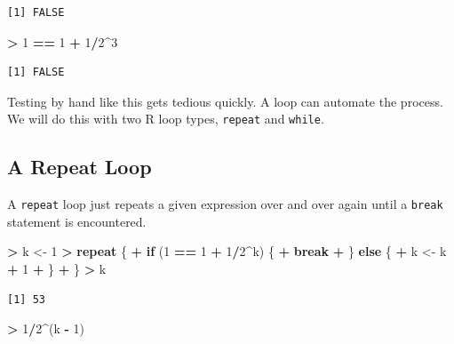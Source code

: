 \documentclass[]{krantz}
\makeatletter
\newenvironment{Shaded}{\begin{snugshade}}{\end{snugshade}}
\newcommand{\ControlFlowTok}[1]{\textcolor[rgb]{0.27,0.27,0.27}{\textbf{#1}}}
\newcommand{\DecValTok}[1]{\textcolor[rgb]{0.06,0.06,0.06}{#1}}
\newcommand{\NormalTok}[1]{#1}
\newcommand{\OperatorTok}[1]{\textcolor[rgb]{0.43,0.43,0.43}{\textbf{#1}}}
\newcommand{\StringTok}[1]{\textcolor[rgb]{0.5,0.5,0.5}{#1}}
\newenvironment{kframe}{%
\medskip{}
\setlength{\fboxsep}{.8em}
 \def\at@end@of@kframe{}%
 \ifinner\ifhmode%
  \def\at@end@of@kframe{\end{minipage}}%
  \begin{minipage}{\columnwidth}%
 \fi\fi%
 \def\FrameCommand##1{\hskip\@totalleftmargin \hskip-\fboxsep
 \colorbox{shadecolor}{##1}\hskip-\fboxsep
     \hskip-\linewidth \hskip-\@totalleftmargin \hskip\columnwidth}%
 \MakeFramed {\advance\hsize-\width
   \@totalleftmargin\z@ \linewidth\hsize
   \@setminipage}}%
 {\par\unskip\endMakeFramed%
 \at@end@of@kframe}
\renewenvironment{Shaded}{\begin{kframe}}{\end{kframe}}
\makeatother
\begin{document}
\begin{verbatim}
[1] FALSE
\end{verbatim}

\begin{Shaded}
\begin{Highlighting}[]
\OperatorTok{>}\StringTok{ }\DecValTok{1} \OperatorTok{==}\StringTok{ }\DecValTok{1} \OperatorTok{+}\StringTok{ }\DecValTok{1}\OperatorTok{/}\DecValTok{2}\OperatorTok{^}\DecValTok{3}
\end{Highlighting}
\end{Shaded}

\begin{verbatim}
[1] FALSE
\end{verbatim}

Testing by hand like this gets tedious quickly. A loop can automate the process. We will do this with two R loop types, \texttt{repeat} and \texttt{while}.

\hypertarget{a-repeat-loop}{%
\subsection{A Repeat Loop}\label{a-repeat-loop}}

A \texttt{repeat} loop just repeats a given expression over and over again until a \texttt{break} statement is encountered.

\begin{Shaded}
\begin{Highlighting}[]
\OperatorTok{>}\StringTok{ }\NormalTok{k <-}\StringTok{ }\DecValTok{1}
\OperatorTok{>}\StringTok{ }\ControlFlowTok{repeat}\NormalTok{ \{}
\OperatorTok{+}\StringTok{   }\ControlFlowTok{if}\NormalTok{ (}\DecValTok{1} \OperatorTok{==}\StringTok{ }\DecValTok{1} \OperatorTok{+}\StringTok{ }\DecValTok{1}\OperatorTok{/}\DecValTok{2}\OperatorTok{^}\NormalTok{k) \{}
\OperatorTok{+}\StringTok{     }\ControlFlowTok{break}
\OperatorTok{+}\StringTok{   }\NormalTok{\} }\ControlFlowTok{else}\NormalTok{ \{}
\OperatorTok{+}\StringTok{     }\NormalTok{k <-}\StringTok{ }\NormalTok{k }\OperatorTok{+}\StringTok{ }\DecValTok{1}
\OperatorTok{+}\StringTok{   }\NormalTok{\}}
\OperatorTok{+}\StringTok{ }\NormalTok{\}}
\OperatorTok{>}\StringTok{ }\NormalTok{k}
\end{Highlighting}
\end{Shaded}

\begin{verbatim}
[1] 53
\end{verbatim}

\begin{Shaded}
\begin{Highlighting}[]
\OperatorTok{>}\StringTok{ }\DecValTok{1}\OperatorTok{/}\DecValTok{2}\OperatorTok{^}\NormalTok{(k }\OperatorTok{-}\StringTok{ }\DecValTok{1}\NormalTok{)}
\end{Highlighting}
\end{Shaded}
\end{document}
